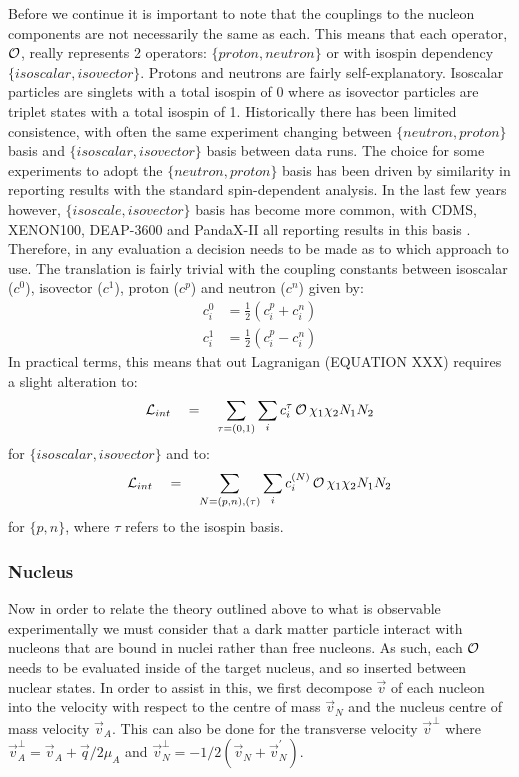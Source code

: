 \par
Before we continue it is important to note that the couplings to the nucleon components are not necessarily the same as each.
This means that each operator, $\operatorname{\mathcal{O}}$, really represents 2 operators: $\{proton,neutron\}$ or with isospin dependency $\{isoscalar,isovector\}$.
Protons and neutrons are fairly self-explanatory.
Isoscalar particles are singlets with a total isospin of 0 where as isovector particles are triplet states with a total isospin of 1.
Historically there has been limited consistence, with often the same experiment changing between $\{neutron, proton\}$ basis and $\{isoscalar, isovector\}$ basis between data runs.
The choice for some experiments to adopt the $\{neutron, proton\}$ basis has been driven by similarity in reporting results with the standard spin-dependent analysis.
In the last few years however, $\{isoscale, isovector\}$ basis has become more common, with CDMS, XENON100, DEAP-3600 and PandaX-II all reporting results in this basis \cite{cdms_eft_ref,xenon100_eft_ref,deap3600_eft_ref,pandax_2_eft_ref}.
Therefore, in any evaluation a decision needs to be made as to which approach to use.
The translation is fairly trivial with the coupling constants between isoscalar ($c^0$), isovector ($c^1$), proton ($c^p$) and neutron ($c^n$) given by:
\begin{equation}
\begin{split}
    c_i^0 &= \frac{1}{2}(c_i^p + c_i^n)  \\
    c_i^1 &= \frac{1}{2}(c_i^p - c_i^n) 
\end{split}
\label{eq:eft_iso_to_pn}
\end{equation}
In practical terms, this means that out Lagranigan (EQUATION XXX) requires a slight alteration to:
\begin{equation}
    \mathcal{L}_{int} \quad = \quad \sum_{\tau = (0,1)} \sum_{i}c^{\tau}_{i} \operatorname{\mathcal{O}} \chi_1 \chi_2 N_1 N_2
\end{equation}
for $\{isoscalar,isovector\}$ and to:
\begin{equation}
    \mathcal{L}_{int} \quad = \quad \sum_{N = (p,n),(\tau)} \sum_{i}c^{(N)}_{i} \operatorname{\mathcal{O}} \chi_1 \chi_2 N_1 N_2
\end{equation}
for $\{p,n\}$, where $\tau$ refers to the isospin basis.


\subsubsection{Nucleus}
\par
Now in order to relate the theory outlined above to what is observable experimentally we must consider that a dark matter particle interact with nucleons that are bound in nuclei rather than free nucleons.
As such, each $\operatorname{\mathcal{O}}$ needs to be evaluated inside of the target nucleus, and so inserted between nuclear states.
In order to assist in this, we first decompose $\vec{v}$ of each nucleon into the velocity with respect to the centre of mass $\vec{v}_{N}$ and the nucleus centre of mass velocity $\vec{v}_{A}$.
This can also be done for the transverse velocity $\vec{v}^{\perp}$ where $\vec{v}^{\perp}_{A}=\vec{v}_A + \vec{q}/2\mu_{A}$ and $\vec{v}^{\perp}_{N}=-1/2(\vec{v}_{N} + \vec{v}^{'}_{N})$.

